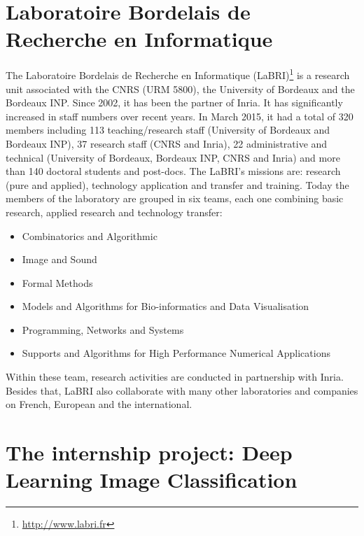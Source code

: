 \documentclass[hidelinks,12pt,a4paper]{report}
\begin{document}
\section{Laboratoire Bordelais de Recherche en Informatique}
The Laboratoire Bordelais de Recherche en Informatique (LaBRI)\footnote{\url{http://www.labri.fr}} is a research unit associated with the CNRS (URM 5800), the University of Bordeaux and the Bordeaux INP. Since 2002, it has been the partner of Inria. It has significantly increased in staff numbers over recent years.
In March 2015, it had a total of 320 members including 113 teaching/research staff (University of Bordeaux and Bordeaux INP), 37 research staff (CNRS and Inria), 22 administrative and technical (University of Bordeaux, Bordeaux INP, CNRS and Inria) and more than 140 doctoral
students and post-docs. The LaBRI’s missions are: research (pure and applied), technology application and transfer and training.
Today the members of the laboratory are grouped in six teams, each one combining basic research, applied research and technology transfer:
\begin{itemize}
	\item Combinatorics and Algorithmic
	\item Image and Sound
	\item Formal Methods
	\item Models and Algorithms for Bio-informatics and Data Visualisation
	\item Programming, Networks and Systems
	\item Supports and Algorithms for High Performance Numerical Applications
\end{itemize}
Within these team, research activities are conducted in partnership with Inria. Besides that, LaBRI also collaborate with many other laboratories and companies on French, European and the international.
\newpage
\section{The internship project: Deep Learning Image Classification}
\end{document}
